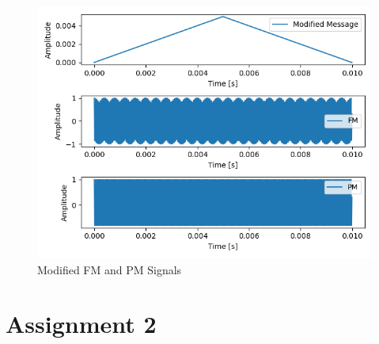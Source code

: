 \documentclass[
	letterpaper, %
	10pt, %
]{CSUniSchoolLabReport}
\begin{document}
\begin{figure}[H] %
	\centering %
	\includegraphics[width=1.2\textwidth]{assignment1b.png} %
	\caption{Modified FM and PM Signals}
	\label{fig:block}
\end{figure}

\section{Assignment 2}
\end{document}
